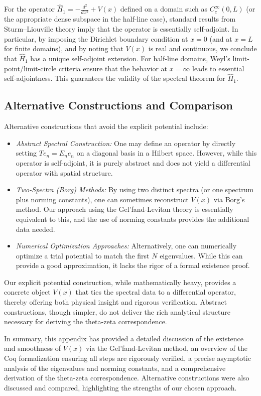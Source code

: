 \documentclass[12pt]{article}
\begin{document}
For the operator \(\hat{H}_1 = -\frac{d^2}{dx^2} + V(x)\) defined on a domain such as \(C_c^\infty(0,L)\) (or the appropriate dense subspace in the half-line case), standard results from Sturm–Liouville theory imply that the operator is essentially self-adjoint. In particular, by imposing the Dirichlet boundary condition at \(x=0\) (and at \(x=L\) for finite domains), and by noting that \(V(x)\) is real and continuous, we conclude that \(\hat{H}_1\) has a unique self-adjoint extension. For half-line domains, Weyl's limit-point/limit-circle criteria ensure that the behavior at \(x=\infty\) leads to essential self-adjointness. This guarantees the validity of the spectral theorem for \(\hat{H}_1\).

\subsection*{Alternative Constructions and Comparison}

Alternative constructions that avoid the explicit potential include:

\begin{itemize}[leftmargin=*, labelsep=5mm]
    \item \emph{Abstract Spectral Construction:} One may define an operator by directly setting \(T e_n = E_n e_n\) on a diagonal basis in a Hilbert space. However, while this operator is self-adjoint, it is purely abstract and does not yield a differential operator with spatial structure.
    
    \item \emph{Two-Spectra (Borg) Methods:} By using two distinct spectra (or one spectrum plus norming constants), one can sometimes reconstruct \(V(x)\) via Borg’s method. Our approach using the Gel’fand-Levitan theory is essentially equivalent to this, and the use of norming constants provides the additional data needed.
    
    \item \emph{Numerical Optimization Approaches:} Alternatively, one can numerically optimize a trial potential to match the first \(N\) eigenvalues. While this can provide a good approximation, it lacks the rigor of a formal existence proof.
\end{itemize}

Our explicit potential construction, while mathematically heavy, provides a concrete object \(V(x)\) that ties the spectral data to a differential operator, thereby offering both physical insight and rigorous verification. Abstract constructions, though simpler, do not deliver the rich analytical structure necessary for deriving the theta-zeta correspondence.

\bigskip

In summary, this appendix has provided a detailed discussion of the existence and smoothness of \(V(x)\) via the Gel’fand-Levitan method, an overview of the Coq formalization ensuring all steps are rigorously verified, a precise asymptotic analysis of the eigenvalues and norming constants, and a comprehensive derivation of the theta-zeta correspondence. Alternative constructions were also discussed and compared, highlighting the strengths of our chosen approach.
\end{document}
